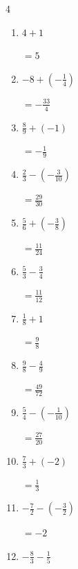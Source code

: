 \begin{multicols}{4}
\begin{enumerate}
        $\displaystyle =\frac{15}{14}$

  \item $\displaystyle 4 + 1$

        $\displaystyle =5$

  \item $\displaystyle -8 + \left(-\frac{1}{4}\right)$

        $\displaystyle =-\frac{33}{4}$

  \item $\displaystyle \frac{8}{9} + \left(-1\right)$

        $\displaystyle =-\frac{1}{9}$

\columnbreak %

  \item $\displaystyle \frac{2}{3} - \left(-\frac{3}{10}\right)$

        $\displaystyle =\frac{29}{30}$

  \item $\displaystyle \frac{5}{6} + \left(-\frac{3}{8}\right)$

        $\displaystyle =\frac{11}{24}$

  \item $\displaystyle \frac{5}{3} - \frac{3}{4}$

        $\displaystyle =\frac{11}{12}$

  \item $\displaystyle \frac{1}{8} + 1$

        $\displaystyle =\frac{9}{8}$

  \item $\displaystyle \frac{9}{8} - \frac{4}{9}$

        $\displaystyle =\frac{49}{72}$

  \item $\displaystyle \frac{5}{4} - \left(-\frac{1}{10}\right)$

        $\displaystyle =\frac{27}{20}$

  \item $\displaystyle \frac{7}{3} + \left(-2\right)$

        $\displaystyle =\frac{1}{3}$

  \item $\displaystyle -\frac{7}{2} - \left(-\frac{3}{2}\right)$

        $\displaystyle =-2$

  \item $\displaystyle -\frac{8}{3} - \frac{1}{5}$


\end{enumerate}
\end{multicols}
